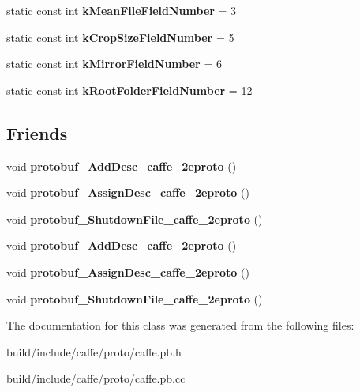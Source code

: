 \begin{DoxyCompactItemize}
static const int {\bfseries k\+Mean\+File\+Field\+Number} = 3
\item 
\mbox{\label{classcaffe_1_1_image_data_parameter_a12d09390bb089da24ed3ca22131d8185}} 
static const int {\bfseries k\+Crop\+Size\+Field\+Number} = 5
\item 
\mbox{\label{classcaffe_1_1_image_data_parameter_a8b4d0192f87fccf8451fab1a8323c92b}} 
static const int {\bfseries k\+Mirror\+Field\+Number} = 6
\item 
\mbox{\label{classcaffe_1_1_image_data_parameter_a6af3dafb3008b4153b237126c052cb4a}} 
static const int {\bfseries k\+Root\+Folder\+Field\+Number} = 12
\end{DoxyCompactItemize}
\subsection*{Friends}
\begin{DoxyCompactItemize}
\item 
\mbox{\label{classcaffe_1_1_image_data_parameter_a2670a9c8ffd0e5105cf7522cd6f8613d}} 
void {\bfseries protobuf\+\_\+\+Add\+Desc\+\_\+caffe\+\_\+2eproto} ()
\item 
\mbox{\label{classcaffe_1_1_image_data_parameter_a7f145bddbdde78003d27e42c7e003d23}} 
void {\bfseries protobuf\+\_\+\+Assign\+Desc\+\_\+caffe\+\_\+2eproto} ()
\item 
\mbox{\label{classcaffe_1_1_image_data_parameter_a026784a8e4e76f1b4daf9d033d2ece83}} 
void {\bfseries protobuf\+\_\+\+Shutdown\+File\+\_\+caffe\+\_\+2eproto} ()
\item 
\mbox{\label{classcaffe_1_1_image_data_parameter_a2670a9c8ffd0e5105cf7522cd6f8613d}} 
void {\bfseries protobuf\+\_\+\+Add\+Desc\+\_\+caffe\+\_\+2eproto} ()
\item 
\mbox{\label{classcaffe_1_1_image_data_parameter_a7f145bddbdde78003d27e42c7e003d23}} 
void {\bfseries protobuf\+\_\+\+Assign\+Desc\+\_\+caffe\+\_\+2eproto} ()
\item 
\mbox{\label{classcaffe_1_1_image_data_parameter_a026784a8e4e76f1b4daf9d033d2ece83}} 
void {\bfseries protobuf\+\_\+\+Shutdown\+File\+\_\+caffe\+\_\+2eproto} ()
\end{DoxyCompactItemize}


The documentation for this class was generated from the following files\+:\begin{DoxyCompactItemize}
\item 
build/include/caffe/proto/caffe.\+pb.\+h\item 
build/include/caffe/proto/caffe.\+pb.\+cc\end{DoxyCompactItemize}
